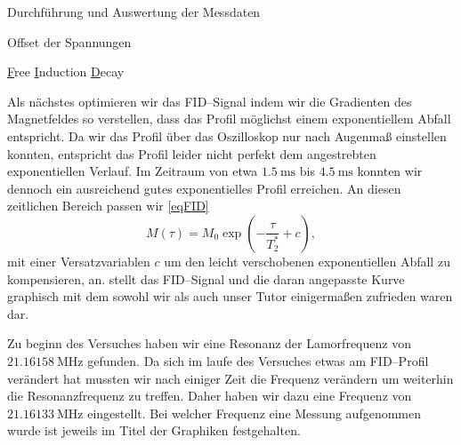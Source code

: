 \documentclass[pdftex, a4paper,11pt, twoside, ngerman]{report}
\begin{document}
\begin{chapter}{Durchführung und Auswertung der Messdaten}
\begin{section}{Offset der Spannungen}
      
    \end{section}
    
    
    
    \begin{section}{
        \underline{F}ree \underline{I}nduction \underline{D}ecay}
      \label{chpFID}
      
      Als nächstes optimieren wir das FID--Signal indem wir die Gradienten
      des Magnetfeldes so verstellen, dass das Profil möglichst einem
      exponentiellem Abfall entspricht.
      Da wir das Profil über das Oszilloskop nur nach Augenmaß einstellen
      konnten, entspricht das Profil leider nicht perfekt dem angestrebten
      exponentiellen Verlauf.
      Im Zeitraum von etwa $\SI{1.5}{\milli\second}$ bis
      $\SI{4.5}{\milli\second}$ konnten wir dennoch ein ausreichend
      gutes exponentielles Profil erreichen.
      An diesen zeitlichen Bereich passen wir \cref{eqFID}
      \begin{equation}
        \label{eqFID}
        M(\tau)=M_{0}\exp{\left(-\frac{\tau}{T_{2}^{*}}+c\right)},
      \end{equation}
      mit einer Versatzvariablen $c$ um den leicht verschobenen exponentiellen
      Abfall zu kompensieren, an.
       stellt das FID--Signal und die daran angepasste Kurve
      graphisch mit dem sowohl wir als auch unser Tutor einigermaßen zufrieden
      waren dar.
      
      Zu beginn des Versuches haben wir eine Resonanz der Lamorfrequenz von
      $\SI{21.16158}{\mega\hertz}$ gefunden.
      Da sich im laufe des Versuches etwas am FID--Profil verändert hat
      mussten wir nach einiger Zeit die Frequenz verändern um weiterhin die
      Resonanzfrequenz zu treffen.
      Daher haben wir dazu eine Frequenz von $\SI{21.16133}{\mega\hertz}$
      eingestellt.
      Bei welcher Frequenz eine Messung aufgenommen wurde ist jeweils im Titel
      der Graphiken festgehalten.
      

\end{section}
\end{chapter}
\end{document}
